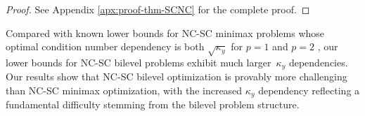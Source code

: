 \documentclass{article}
\begin{document}
\begin{proof}
    See Appendix \ref{apx:proof-thm-SCNC} for the complete proof.
\end{proof}


Compared with known lower bounds for NC-SC minimax problems whose optimal
condition number dependency is both $\sqrt{\kappa_y}$ for $p=1$
\citep{li2021complexity,zhang2021complexity} and $p=2$ \citep{wang2024efficient}, our lower bounds for NC-SC bilevel problems exhibit much larger~$\kappa_y$ dependencies. Our results show that NC-SC bilevel optimization is provably more challenging than NC-SC minimax optimization, with the increased $\kappa_y$ dependency reflecting a fundamental difficulty stemming from the bilevel problem structure.



\end{document}
